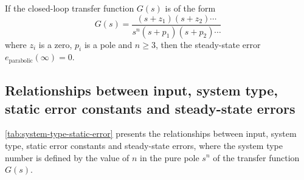 \documentclass[10pt, twocolumn]{article}
\begin{document}
If the closed-loop transfer function \(G(s)\) is of the form
\[
  G(s) = \frac{(s + z_1)(s + z_2)\cdots}{s^n (s + p_1) (s + p_2) \cdots}
\]
where \(z_i\) is a zero, \(p_i\) is a pole and \(n \geqslant 3\), then the steady-state error \(e_\mathrm{parabolic}(\infty) = 0\).


\subsection{Relationships between input, system type, static error constants and steady-state errors}
\vref{tab:system-type-static-error} presents the relationships between input, system type, static error constants and steady-state errors, where the system type number is defined by the value of \(n\) in the pure pole \(s^n\) of the transfer function \(G(s)\).
\end{document}
